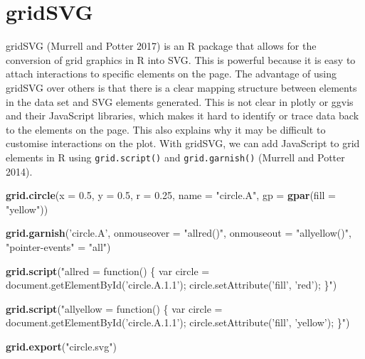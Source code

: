 \documentclass[11pt,]{report}
\newenvironment{Shaded}{\begin{snugshade}}{\end{snugshade}}
\newcommand{\KeywordTok}[1]{\textcolor[rgb]{0.13,0.29,0.53}{\textbf{#1}}}
\newcommand{\DataTypeTok}[1]{\textcolor[rgb]{0.13,0.29,0.53}{#1}}
\newcommand{\FloatTok}[1]{\textcolor[rgb]{0.00,0.00,0.81}{#1}}
\newcommand{\StringTok}[1]{\textcolor[rgb]{0.31,0.60,0.02}{#1}}
\newcommand{\NormalTok}[1]{#1}
\begin{document}
\section{gridSVG}\label{gridsvg}

\textsf{gridSVG} (Murrell and Potter 2017) is an R package that allows
for the conversion of grid graphics in R into SVG. This is powerful
because it is easy to attach interactions to specific elements on the
page. The advantage of using \textsf{gridSVG} over others is that there
is a clear mapping structure between elements in the data set and SVG
elements generated. This is not clear in \textsf{plotly} or
\textsf{ggvis} and their JavaScript libraries, which makes it hard to
identify or trace data back to the elements on the page. This also
explains why it may be difficult to customise interactions on the plot.
With \textsf{gridSVG}, we can add JavaScript to \textsf{grid} elements
in R using \texttt{grid.script()} and \texttt{grid.garnish()} (Murrell
and Potter 2014).

\begin{Shaded}
\begin{Highlighting}[]
\KeywordTok{grid.circle}\NormalTok{(}\DataTypeTok{x =} \FloatTok{0.5}\NormalTok{, }\DataTypeTok{y =} \FloatTok{0.5}\NormalTok{, }\DataTypeTok{r =} \FloatTok{0.25}\NormalTok{, }\DataTypeTok{name =} \StringTok{"circle.A"}\NormalTok{,}
            \DataTypeTok{gp =} \KeywordTok{gpar}\NormalTok{(}\DataTypeTok{fill =} \StringTok{"yellow"}\NormalTok{))}

\KeywordTok{grid.garnish}\NormalTok{(}\StringTok{'circle.A'}\NormalTok{, }\DataTypeTok{onmouseover =} \StringTok{"allred()"}\NormalTok{,}
             \DataTypeTok{onmouseout =} \StringTok{"allyellow()"}\NormalTok{, }\StringTok{"pointer-events"}\NormalTok{ =}\StringTok{ "all"}\NormalTok{)}

\KeywordTok{grid.script}\NormalTok{(}\StringTok{"allred = function() \{}
\StringTok{  var circle = document.getElementById('circle.A.1.1');}
\StringTok{  circle.setAttribute('fill', 'red');}
\StringTok{  \}"}\NormalTok{)}

\KeywordTok{grid.script}\NormalTok{(}\StringTok{"allyellow = function() \{}
\StringTok{  var circle = document.getElementById('circle.A.1.1');}
\StringTok{  circle.setAttribute('fill', 'yellow');}
\StringTok{  \}"}\NormalTok{)}

\KeywordTok{grid.export}\NormalTok{(}\StringTok{"circle.svg"}\NormalTok{)}
\end{Highlighting}
\end{Shaded}
\end{document}
